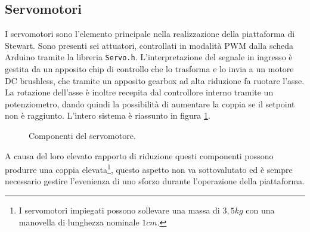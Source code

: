 \documentclass[12pt,twoside,openright]{article}
\begin{document}

\subsection{Servomotori}\label{servomotori}
I servomotori sono l'elemento principale nella realizzazione della piattaforma di Stewart. Sono presenti sei attuatori, controllati in modalità PWM dalla scheda Arduino tramite la libreria \texttt{Servo.h}. L'interpretazione del segnale in ingresso è gestita da un apposito chip di controllo che lo trasforma e lo invia a un motore DC brushless, che tramite un apposito gearbox ad alta riduzione fa ruotare l'asse. La rotazione dell'asse è inoltre recepita dal controllore interno tramite un potenziometro, dando quindi la possibilità di aumentare la coppia se il setpoint non è raggiunto. L'intero sistema è riassunto in figura \ref{fig:servo}. 
\begin{figure}[h!]
\centering
{}
\caption{Componenti del servomotore.} \label{fig:servo}
\end{figure}
A causa del loro elevato rapporto di riduzione questi componenti possono produrre una coppia elevata\footnote{I servomotori impiegati possono sollevare una massa di $3,5kg$ con una manovella di lunghezza nominale $1cm$.}, questo aspetto  non va sottovalutato ed è sempre necessario gestire l'evenienza di uno sforzo durante l'operazione della piattaforma.
\end{document}
